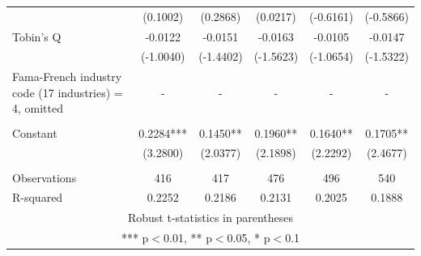 \documentclass[12pt]{article}
\begin{document}
\begin{table}
\begin{adjustbox}{max width=\textwidth}
\begin{tabular}{lccccc}
			 & (0.1002) & (0.2868) & (0.0217) & (-0.6161) & (-0.5866) \\
			Tobin's Q & -0.0122 & -0.0151 & -0.0163 & -0.0105 & -0.0147 \\
			 & (-1.0040) & (-1.4402) & (-1.5623) & (-1.0654) & (-1.5322) \\
			Fama-French industry code (17 industries) = 4, omitted & - & - & - & - & - \\
			 &  &  &  &  &  \\
			Constant & 0.2284*** & 0.1450** & 0.1960** & 0.1640** & 0.1705** \\
			 & (3.2800) & (2.0377) & (2.1898) & (2.2292) & (2.4677) \\
			 &  &  &  &  &  \\
			Observations & 416 & 417 & 476 & 496 & 540 \\
			 R-squared & 0.2252 & 0.2186 & 0.2131 & 0.2025 & 0.1888 \\ \hline
			\multicolumn{6}{c}{ Robust t-statistics in parentheses} \\
			\multicolumn{6}{c}{ *** p$<$0.01, ** p$<$0.05, * p$<$0.1} \\
			\end{tabular}	
	\end{adjustbox}
\end{table}
\end{document}
